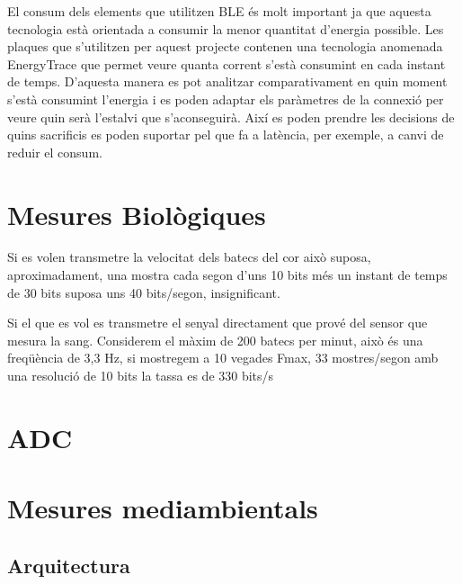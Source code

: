 El consum dels elements que utilitzen BLE és molt important ja que aquesta tecnologia està orientada a consumir la menor quantitat d'energia possible.
Les plaques que s'utilitzen per aquest projecte contenen una tecnologia anomenada EnergyTrace que permet veure quanta corrent s'està consumint en cada instant de temps.
D'aquesta manera es pot analitzar comparativament en quin moment s'està consumint l'energia i es poden adaptar els paràmetres de la connexió per veure quin serà l'estalvi que s'aconseguirà.
Així es poden prendre les decisions de quins sacrificis es poden suportar pel que fa a latència, per exemple, a canvi de reduir el consum.




\section{Mesures Biològiques}

Si es volen transmetre la velocitat dels batecs del cor això suposa, aproximadament, una mostra cada segon d'uns 10 bits més un instant de temps de 30 bits suposa uns 40 bits/segon, insignificant.

Si el que es vol es transmetre el senyal directament que prové del sensor que mesura la sang.
Considerem el màxim de 200 batecs per minut, això és una freqüència de 3,3 Hz, si mostregem a 10 vegades Fmax, 33 mostres/segon amb una resolució de 10 bits la tassa es de 330 bits/s

\section{ADC}


\section{Mesures mediambientals}
\subsection{Arquitectura}
